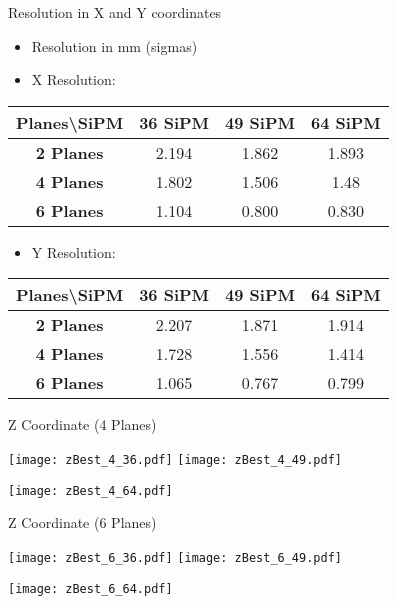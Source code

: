\documentclass{beamer}
\begin{document}
\begin{frame}{Resolution in X and Y coordinates}
\begin{center}
\begin{itemize}
\item Resolution in mm (sigmas)
\item X Resolution:
\vspace{0.5 cm}
\end{itemize} \begin{tabular}{c|ccc|}
  \toprule
  Planes\textbackslash SiPM & \textbf{36 SiPM} & \textbf{49 SiPM} & \textbf{64 SiPM} \\
   \hline
  \textbf{2 Planes} & 2.194 & 1.862 & 1.893 \\
  \textbf{4 Planes} & 1.802 & 1.506 & 1.48 \\
  \textbf{6 Planes} & 1.104 & 0.800 & 0.830 \\
    \toprule
 \end{tabular}
\begin{itemize}
\item Y Resolution:
\vspace{0.5 cm}
\end{itemize}
 \begin{tabular}{c|ccc|}
  \toprule
  Planes\textbackslash SiPM & \textbf{36 SiPM} & \textbf{49 SiPM} & \textbf{64 SiPM} \\
   \hline
  \textbf{2 Planes} & 2.207 & 1.871 & 1.914 \\
  \textbf{4 Planes} & 1.728 & 1.556 & 1.414 \\
  \textbf{6 Planes} & 1.065 & 0.767 & 0.799 \\
    \toprule
 \end{tabular}
\end{center}
\end{frame}

\begin{frame}{Z Coordinate (4 Planes)}
\begin{adjustwidth}{-1.5em}{-1.5em}
	\texttt{[image: zBest\_4\_36.pdf]}
	\texttt{[image: zBest\_4\_49.pdf]} \\
	\begin{center} {\texttt{[image: zBest\_4\_64.pdf]}} \end{center}
\end{adjustwidth}
\end{frame}

\begin{frame}{Z Coordinate (6 Planes)}
\begin{adjustwidth}{-1.5em}{-1.5em}
	\texttt{[image: zBest\_6\_36.pdf]}
	\texttt{[image: zBest\_6\_49.pdf]} \\
	\begin{center} {\texttt{[image: zBest\_6\_64.pdf]}} \end{center}
\end{adjustwidth}
\end{frame}
\end{document}
